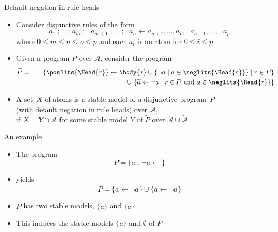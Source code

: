 \begin{frame}{Default negation in rule heads}
  \begin{itemize}
  \item<1-> Consider disjunctive rules of the form
    \[
    a_1\;;\dots\;;a_m\;;{\neg a_{m+1}}\;;\dots\;;{\neg a_n}
    \leftarrow
    a_{n+1},\dots,a_o,{\neg a_{o+1}},\dots,{\neg a_p}
    \]
    where $0\leq m\leq n\leq o\leq p$ and each $a_i$ is an atom for $0\leq i\leq p$

  \item<2-> Given a program $P$ over $\mathcal{A}$, consider the program
    \begin{eqnarray*}
      \widetilde{P}
      &=&\phantom{\cup\ }
\{\poslits{\Head{r}}\leftarrow \body{r}\cup\{{\neg \widetilde{a}}\mid a\in\neglits{\Head{r}}\}\mid r\in P\}
      \\
      &&\cup\
\{\widetilde{a}\leftarrow{\neg a}\mid r\in P \text{ and } a\in\neglits{\Head{r}}\}
    \end{eqnarray*}
  \item<3->
    A set~$X$ of atoms is a \alert{stable model} of a disjunctive program~$P$\\
    (with default negation in rule heads) over $\mathcal{A}$,
    \\
    if $X=Y\cap\mathcal{A}$ for some stable model $Y$ of $\widetilde{P}$ over $\mathcal{A}\cup\widetilde{\mathcal{A}}$
  \end{itemize}
\end{frame}
\begin{frame}{An example}
  \begin{itemize}
  \item<1-> The program
    \[
    P = \{ a\;;\, {\neg a} \leftarrow \}
    \]
  \item<2-> [] yields
    \[
    \widetilde{P}
    =
    \{
    a \leftarrow {\neg \widetilde{a}}
    \}
    \cup
    \{
    \widetilde{a}\leftarrow{\neg a}
    \}
    \]
  \item<3-> $\widetilde{P}$ has two stable models, $\{a\}$ and $\{\widetilde{a}\}$
  \item<4-> This induces the stable models $\{a\}$ and $\emptyset$ of $P$
  \end{itemize}
\end{frame}
%
